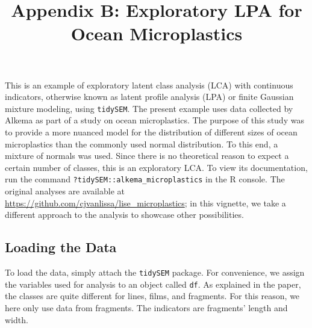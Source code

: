 \documentclass[
  man,floatsintext]{apa6}
\title{Appendix B: Exploratory LPA for Ocean Microplastics}
\author{\phantom{0}}
\date{}
\affiliation{\phantom{0}}
\newenvironment{Shaded}{\begin{snugshade}}{\end{snugshade}}
\newcommand{\CommentTok}[1]{\textcolor[rgb]{0.56,0.35,0.01}{\textit{#1}}}
\newcommand{\FunctionTok}[1]{\textcolor[rgb]{0.00,0.00,0.00}{#1}}
\newcommand{\NormalTok}[1]{#1}
\newcommand{\OtherTok}[1]{\textcolor[rgb]{0.56,0.35,0.01}{#1}}
\newcommand{\SpecialCharTok}[1]{\textcolor[rgb]{0.00,0.00,0.00}{#1}}
\newcommand{\StringTok}[1]{\textcolor[rgb]{0.31,0.60,0.02}{#1}}
\begin{document}
\maketitle

This is an example of exploratory latent class analysis (LCA) with continuous indicators,
otherwise known as latent profile analysis (LPA) or finite Gaussian mixture modeling, using \texttt{tidySEM}.
The present example uses data collected by Alkema as part of a study on ocean microplastics.
The purpose of this study was to provide a more nuanced model for the distribution of different sizes of ocean microplastics than the commonly used normal distribution.
To this end, a mixture of normals was used.
Since there is no theoretical reason to expect a certain number of classes, this is an exploratory LCA.
To view its documentation,
run the command \texttt{?tidySEM::alkema\_microplastics} in the R console.
The original analyses are available at \url{https://github.com/cjvanlissa/lise_microplastics};
in this vignette, we take a different approach to the analysis to showcase other possibilities.

\hypertarget{loading-the-data}{%
\subsection{Loading the Data}\label{loading-the-data}}

To load the data, simply attach the \texttt{tidySEM} package.
For convenience, we assign the variables used for analysis to an object called \texttt{df}.
As explained in the paper, the classes are quite different for lines, films, and fragments.
For this reason, we here only use data from fragments.
The indicators are fragments' length and width.

\begin{Shaded}
\end{Shaded}
\end{document}
